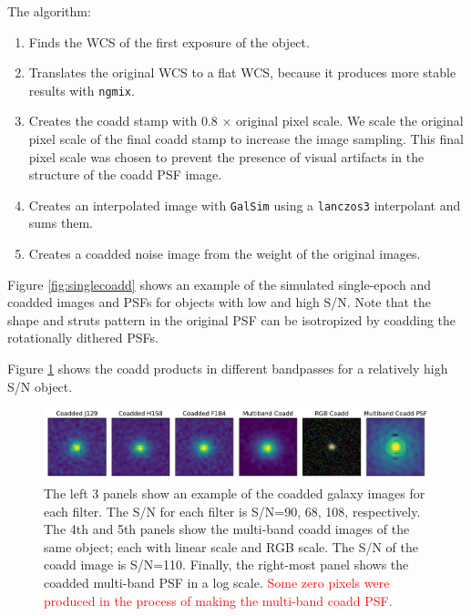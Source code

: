 \documentclass[fleqn,usenatbib]{mnras}
\begin{document}
The algorithm: 
\begin{enumerate}
    \setlength\itemsep{1em}
    \item Finds the WCS of the first exposure of the object.
    \item Translates the original WCS to a flat WCS, because it produces more stable results with \texttt{ngmix}.
    \item Creates the coadd stamp with 0.8 $\times$ original pixel scale. We scale the original pixel scale of the final coadd stamp to increase the image sampling. This final pixel scale was chosen to prevent the presence of visual artifacts in the structure of the coadd PSF image. 
    \item Creates an interpolated image with \texttt{GalSim}  using a \texttt{lanczos3} interpolant and sums them. 
    \item Creates a coadded noise image from the weight of the original images. 
\end{enumerate}
Figure \ref{fig:singlecoadd} shows an example of the simulated single-epoch and coadded images and PSFs for objects with low and high S/N. Note that the shape and struts pattern in the original PSF can be isotropized by coadding the rotationally dithered PSFs. 


Figure \ref{fig:single_to_coadd_rgb} shows the coadd products in different bandpasses for a relatively high S/N object.



\begin{figure}
	\includegraphics[width=\textwidth]{coadd_galaxy_example_log_v2.pdf}
    \caption{The left 3 panels show an example of the coadded galaxy images for each filter. The S/N for each filter is S/N=90, 68, 108, respectively. The 4th and 5th panels show the multi-band coadd images of the same object; each with linear scale and RGB scale. The S/N of the coadd image is S/N=110. Finally, the right-most panel shows the coadded multi-band PSF in a log scale. \textcolor{red}{Some zero pixels were produced in the process of making the multi-band coadd PSF. }}
    \label{fig:single_to_coadd_rgb}
\end{figure}
\end{document}
